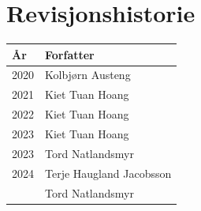 \section*{Revisjonshistorie}
\begin{center}
 \begin{tabular}{|p{2.5cm} p{5.5cm}|} 
 \hline
 År & Forfatter \\ [0.5ex] 
 \hline\hline
 2020 & Kolbjørn Austeng\\
 \hline
 2021 & Kiet Tuan Hoang\\
 \hline
 2022 & Kiet Tuan Hoang \\ 
 \hline
 2023 & Kiet Tuan Hoang \\
 2023 & Tord Natlandsmyr \\
 \hline
 2024 & Terje Haugland Jacobsson \\
      & Tord Natlandsmyr \\
 \hline
\end{tabular}
\end{center}

